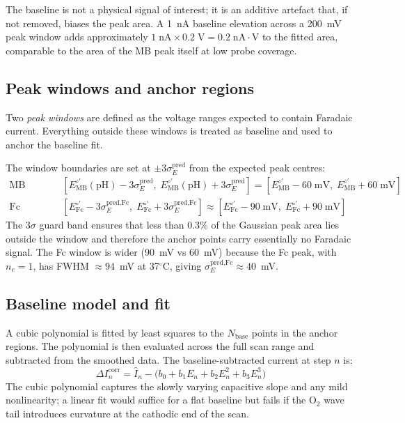 \documentclass[10pt,a4paper]{article}
\numberwithin{equation}{section}
\newcommand{\Eo}{E^{\circ\prime}}
\newcommand{\DI}{\Delta I}
\begin{document}
The baseline is not a physical signal of interest; it is an additive
artefact that, if not removed, biases the peak area. A 1~nA baseline
elevation across a 200~mV peak window adds approximately
$1\;\text{nA} \times 0.2\;\text{V} = 0.2\;\text{nA}\cdot\text{V}$
to the fitted area, comparable to the area of the MB peak itself at low
probe coverage.

\subsection{Peak windows and anchor regions}

Two \textit{peak windows} are defined as the voltage ranges expected to
contain Faradaic current. Everything outside these windows is treated as
baseline and used to anchor the baseline fit.

The window boundaries are set at $\pm 3\sigma_E^\text{pred}$ from the
expected peak centres:
\begin{align}
  \text{MB window:}&\quad
  [\Eo_\text{MB}(\text{pH}) - 3\sigma_E^\text{pred},\;
   \Eo_\text{MB}(\text{pH}) + 3\sigma_E^\text{pred}]
  = [\Eo_\text{MB} - 60\;\text{mV},\;\Eo_\text{MB} + 60\;\text{mV}]
  \label{eq:mbwindow}\\[0.3em]
  \text{Fc window:}&\quad
  [\Eo_\text{Fc} - 3\sigma_E^\text{pred,Fc},\;
   \Eo_\text{Fc} + 3\sigma_E^\text{pred,Fc}]
  \approx [\Eo_\text{Fc} - 90\;\text{mV},\;\Eo_\text{Fc} + 90\;\text{mV}]
  \label{eq:fcwindow}
\end{align}
The $3\sigma$ guard band ensures that less than 0.3\% of the Gaussian peak
area lies outside the window and therefore the anchor points carry
essentially no Faradaic signal. The Fc window is wider (90~mV vs 60~mV)
because the Fc peak, with $n_e = 1$, has FWHM $\approx 94$~mV at 37$^\circ$C,
giving $\sigma_E^\text{pred,Fc} \approx 40$~mV.

\subsection{Baseline model and fit}

A cubic polynomial is fitted by least squares to the $N_\text{base}$ points
in the anchor regions. The polynomial is then evaluated across the full
scan range and subtracted from the smoothed data. The baseline-subtracted
current at step $n$ is:
\begin{equation}
  \DI_n^\text{corr} = \hat{I}_n - \bigl(b_0 + b_1 E_n + b_2 E_n^2 + b_3 E_n^3\bigr)
  \label{eq:baseline}
\end{equation}
The cubic polynomial captures the slowly varying capacitive slope and any
mild nonlinearity; a linear fit would suffice for a flat baseline but
fails if the O$_2$ wave tail introduces curvature at the cathodic end of
the scan.
\end{document}
